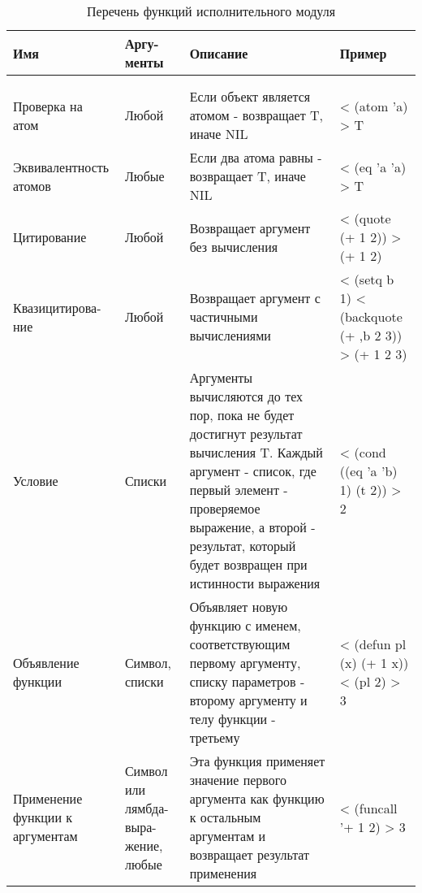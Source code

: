 \begin{xltabular}{\textwidth}{|p{3.6cm}|p{1.8cm}|p{6cm}|X|}
	\caption{Перечень функций исполнительного модуля\label{funcprimeval:table}}\\ \hline
	\centrow Имя & \centrow Аргу- \linebreak менты & \centrow Описание & \centrow Пример \\ \hline
	 &  &  &  \\ \hline
	\endfirsthead
	 &  &  &  \\ \hline
	\finishhead
	Проверка на атом & Любой & Если объект является атомом - возвращает T, иначе NIL & < (atom 'a) \linebreak > T \\ \hline 
	Эквивалентность атомов & Любые & Если два атома равны - возвращает T, иначе NIL & < (eq 'a 'a) \linebreak > T \\ \hline 
	Цитирование & Любой & Возвращает аргумент без вычисления & < (quote (+ 1 2)) \linebreak > (+ 1 2) \\ \hline 
	Квазицитирова-\linebreak ние & Любой & Возвращает аргумент с частичными вычислениями & < (setq b 1) \linebreak < (backquote (+ ,b 2 3)) \linebreak > (+ 1 2 3) \\ \hline 
	Условие & Списки & Аргументы вычисляются до тех пор, пока не будет достигнут результат вычисления T. Каждый аргумент - список, где первый элемент - проверяемое выражение, а второй - результат, который будет возвращен при истинности выражения & < (cond ((eq 'a 'b) 1) (t 2)) \linebreak > 2 \\ \hline 
	Объявление функции & Символ, списки & Объявляет новую функцию с именем, соответствующим первому аргументу, списку параметров - второму аргументу и телу функции - третьему & < (defun pl (x) (+ 1 x)) \linebreak < (pl 2) \linebreak > 3 \\ \hline 
	Применение функции к аргументам & Символ или лямбда-выра- \linebreak жение, любые & Эта функция применяет значение первого аргумента как функцию к остальным аргументам и возвращает результат применения & < (funcall '+ 1 2) \linebreak > 3 \\ \hline 

\end{xltabular}
